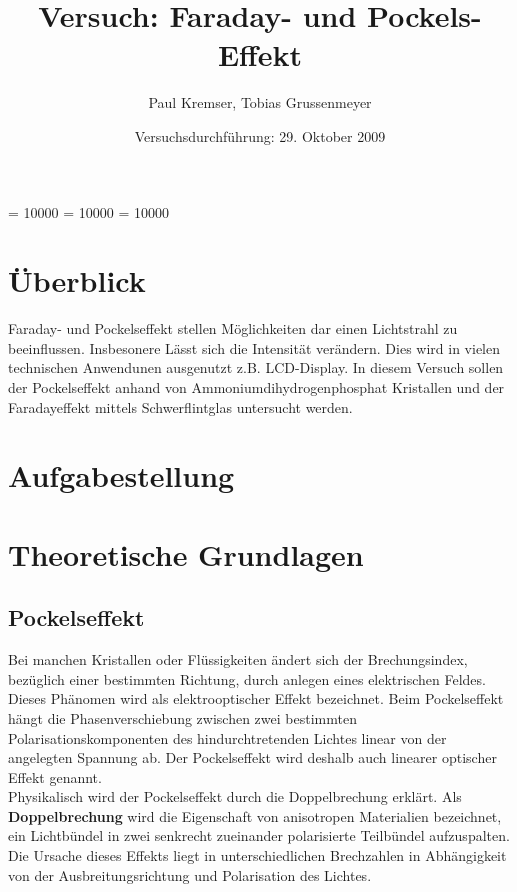 \documentclass[12pt]{article}
\newcommand{\changefont}[3]{
\fontfamily{#1} \fontseries{#2} \fontshape{#3} \selectfont}
\begin{document}
\clubpenalty = 10000
\widowpenalty = 10000 
\displaywidowpenalty = 10000

\onehalfspacing
\changefont{ptm}{m}{n} 

\begin{titlepage}
\author{Paul Kremser, Tobias Grussenmeyer}
\title{Versuch: Faraday- und Pockels-Effekt}
\date{Versuchsdurchführung: 29. Oktober 2009} 
\maketitle
\thispagestyle{empty}
\end{titlepage}


\tableofcontents
\thispagestyle{empty}
\newpage
{}
\section{Überblick}
Faraday- und Pockelseffekt stellen Möglichkeiten dar einen Lichtstrahl zu beeinflussen. Insbesonere Lässt sich die Intensität verändern. Dies wird in vielen technischen Anwendunen ausgenutzt z.B. LCD-Display. In diesem Versuch sollen der Pockelseffekt anhand von Ammoniumdihydrogenphosphat Kristallen und der Faradayeffekt mittels Schwerflintglas untersucht werden.
\section{Aufgabestellung}

\section{Theoretische Grundlagen}

\subsection{Pockelseffekt}

Bei manchen Kristallen oder Flüssigkeiten ändert sich der Brechungsindex, bezüglich einer bestimmten Richtung, durch anlegen eines elektrischen Feldes. Dieses Phänomen wird als elektrooptischer Effekt bezeichnet. Beim Pockelseffekt hängt die Phasenverschiebung zwischen zwei bestimmten Polarisationskomponenten des hindurchtretenden Lichtes linear von der angelegten Spannung ab. Der Pockelseffekt wird deshalb auch linearer optischer Effekt genannt.\\

Physikalisch wird der Pockelseffekt durch die Doppelbrechung erklärt.
Als \textbf{Doppelbrechung} wird die Eigenschaft von anisotropen Materialien bezeichnet, ein Lichtbündel in zwei senkrecht zueinander polarisierte Teilbündel aufzuspalten. Die Ursache dieses Effekts liegt in unterschiedlichen Brechzahlen in Abhängigkeit von der Ausbreitungsrichtung und Polarisation des Lichtes.
\end{document}
